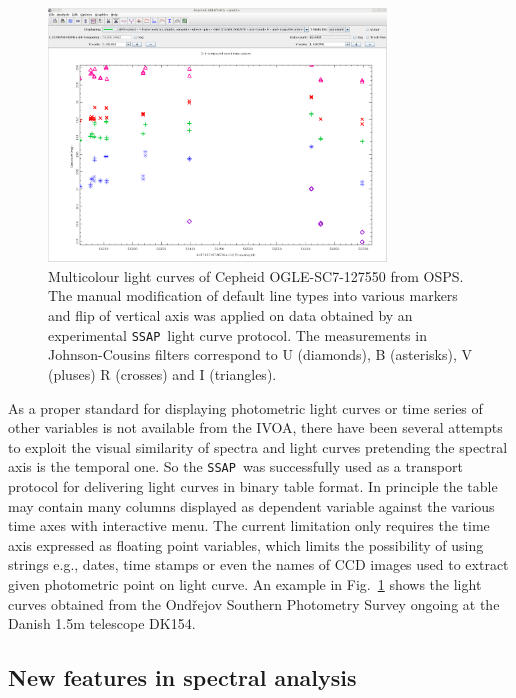 \documentclass[final,authoryear,5p,times,twocolumn]{elsarticle}
\newcommand{\ssap}{\texttt{SSAP}}
\begin{document}
\begin{figure}[tbh]
\begin{center}
\includegraphics[width=0.8\textwidth]{OGLE-SC7-127550_plot.pdf}
\caption{Multicolour light curves of Cepheid OGLE-SC7-127550 from OSPS. The
manual modification of default line types into various markers and flip of
vertical axis was applied on data obtained by an experimental \ssap\ light
curve protocol.  The measurements in Johnson-Cousins filters correspond to U
(diamonds), B (asterisks), V (pluses) R (crosses) and I (triangles).  }
\label{fig:OGLE-SC7-127550_plot}
\end{center}
\end{figure}

As a proper standard for displaying photometric light curves or time series of
other variables is not available from the IVOA, there have been several
attempts to exploit the visual similarity of spectra and light curves
pretending the spectral axis is the temporal one.  So the \ssap\ was
successfully used as a transport protocol for delivering light curves in binary
table format. In principle the table may contain many columns displayed as
dependent variable against the various time axes with interactive menu.  The
current limitation only requires the time axis expressed as floating point
variables, which limits the possibility of using strings e.g., dates, time
stamps or even the names of CCD images used to extract given photometric point
on light curve.  An example in Fig.~\ref{fig:OGLE-SC7-127550_plot} shows the
light curves obtained from the Ond\v{r}ejov Southern Photometry Survey
\citep{skoda_adassxxiii} ongoing at the Danish 1.5m telescope DK154.

\subsection{New features in spectral analysis}
\end{document}

